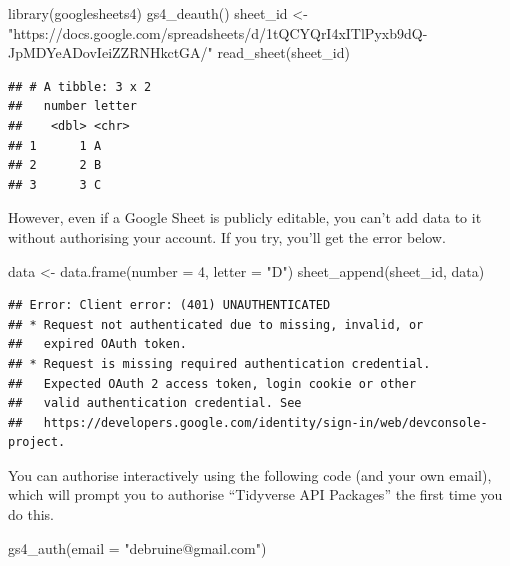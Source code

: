 \documentclass[
  oneside]{book}
\newenvironment{Shaded}{\begin{snugshade}}{\end{snugshade}}
\newcommand{\AttributeTok}[1]{\textcolor[rgb]{0.77,0.63,0.00}{#1}}
\newcommand{\DecValTok}[1]{\textcolor[rgb]{0.00,0.00,0.81}{#1}}
\newcommand{\FunctionTok}[1]{\textcolor[rgb]{0.00,0.00,0.00}{#1}}
\newcommand{\NormalTok}[1]{#1}
\newcommand{\OtherTok}[1]{\textcolor[rgb]{0.56,0.35,0.01}{#1}}
\newcommand{\StringTok}[1]{\textcolor[rgb]{0.31,0.60,0.02}{#1}}
\begin{document}
\begin{Shaded}
\begin{Highlighting}[]
\FunctionTok{library}\NormalTok{(googlesheets4)}
\FunctionTok{gs4\_deauth}\NormalTok{()}
\NormalTok{sheet\_id }\OtherTok{\textless{}{-}} \StringTok{"https://docs.google.com/spreadsheets/d/1tQCYQrI4xITlPyxb9dQ{-}JpMDYeADovIeiZZRNHkctGA/"}
\FunctionTok{read\_sheet}\NormalTok{(sheet\_id)}
\end{Highlighting}
\end{Shaded}

\begin{verbatim}
## # A tibble: 3 x 2
##   number letter
##    <dbl> <chr> 
## 1      1 A     
## 2      2 B     
## 3      3 C
\end{verbatim}

However, even if a Google Sheet is publicly editable, you can't add data to it without authorising your account. If you try, you'll get the error below.

\begin{Shaded}
\begin{Highlighting}[]
\NormalTok{data }\OtherTok{\textless{}{-}} \FunctionTok{data.frame}\NormalTok{(}\AttributeTok{number =} \DecValTok{4}\NormalTok{, }\AttributeTok{letter =} \StringTok{"D"}\NormalTok{)}
\FunctionTok{sheet\_append}\NormalTok{(sheet\_id, data)}
\end{Highlighting}
\end{Shaded}

\begin{verbatim}
## Error: Client error: (401) UNAUTHENTICATED
## * Request not authenticated due to missing, invalid, or
##   expired OAuth token.
## * Request is missing required authentication credential.
##   Expected OAuth 2 access token, login cookie or other
##   valid authentication credential. See
##   https://developers.google.com/identity/sign-in/web/devconsole-project.
\end{verbatim}

You can authorise interactively using the following code (and your own email), which will prompt you to authorise ``Tidyverse API Packages'' the first time you do this.

\begin{Shaded}
\begin{Highlighting}[]
\FunctionTok{gs4\_auth}\NormalTok{(}\AttributeTok{email =} \StringTok{"debruine@gmail.com"}\NormalTok{)}
\end{Highlighting}
\end{Shaded}
\end{document}
